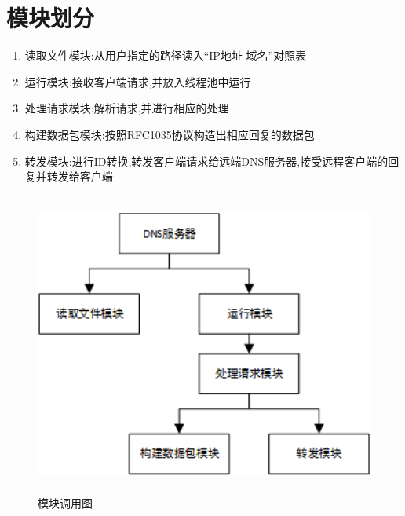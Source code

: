 \documentclass{ctexart}
\begin{document}
\section{模块划分}
\label{sec:module}
\begin{enumerate}
    \item 读取文件模块:从用户指定的路径读入“IP地址-域名”对照表
    \item 运行模块:接收客户端请求,并放入线程池中运行
    \item 处理请求模块:解析请求,并进行相应的处理
    \item 构建数据包模块:按照RFC1035协议构造出相应回复的数据包
    \item 转发模块:进行ID转换,转发客户端请求给远端DNS服务器,接受远程客户端的回复并转发给客户端
\end{enumerate}
\begin{figure}[H]
  \centering
  \includegraphics[width=15cm,height=10cm]{img/module.png}
  \caption{模块调用图}
\end{figure}
\end{document}
